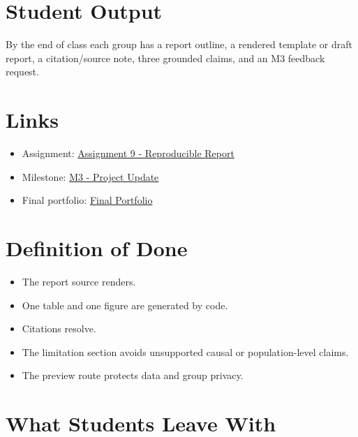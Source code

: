\documentclass[
  letterpaper,
  DIV=11,
  numbers=noendperiod,
  oneside]{scrreprt}
\providecommand{\tightlist}{%
  \setlength{\itemsep}{0pt}\setlength{\parskip}{0pt}}
\begin{document}
\section*{Student Output}\label{student-output-8}


By the end of class each group has a report outline, a rendered template
or draft report, a citation/source note, three grounded claims, and an
M3 feedback request.

\section*{Links}\label{links-4}


\begin{itemize}
\tightlist
\item
  Assignment:
  \href{../../assignments/assignment09-reporting/README.md}{Assignment 9
  - Reproducible Report}
\item
  Milestone: \href{../../milestones/m3-project-update/README.md}{M3 -
  Project Update}
\item
  Final portfolio:
  \href{../../milestones/final-portfolio/README.md}{Final Portfolio}
\end{itemize}

\section*{Definition of Done}\label{definition-of-done-6}


\begin{itemize}
\tightlist
\item
  The report source renders.
\item
  One table and one figure are generated by code.
\item
  Citations resolve.
\item
  The limitation section avoids unsupported causal or population-level
  claims.
\item
  The preview route protects data and group privacy.
\end{itemize}

\section*{What Students Leave With}\label{what-students-leave-with-5}
\end{document}
